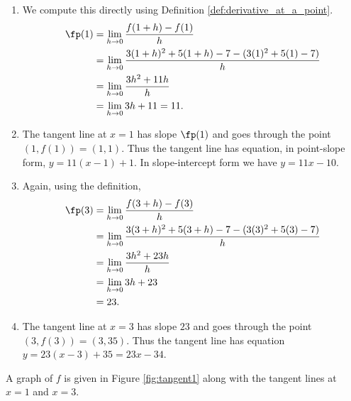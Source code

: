 %
{	\begin{enumerate}
	\item We compute this directly using Definition \ref{def:derivative_at_a_point}.
		\begin{align*}
			\fp(1) &= \lim_{h\to 0} \frac{f(1+h)-f(1)}{h} \\
				   &= \lim_{h\to 0} \frac{3(1+h)^2+5(1+h)-7 - (3(1)^2+5(1)-7)}{h}\\
				   &= \lim_{h\to 0} \frac{3h^2+11h}{h}\\
				   &= \lim_{h\to 0} 3h+11=11.%
		\end{align*}
	\item The tangent line at $x=1$ has slope $\fp(1)$ and goes through the point $(1,f(1)) = (1,1)$. Thus the tangent line has equation, in point-slope form, $y = 11(x-1) + 1$. In slope-intercept form we have $y = 11x-10$.
	\item Again, using the definition,
		\begin{align*}
			\fp(3) &= \lim_{h\to 0} \frac{f(3+h)-f(3)}{h} \\
				   &= \lim_{h\to 0} \frac{3(3+h)^2+5(3+h)-7 - (3(3)^2+5(3)-7)}{h} \\
				   &= \lim_{h\to 0} \frac{3h^2+23h}{h}\\
				   &= \lim_{h\to 0} 3h+23 \\
				   &= 23.
		\end{align*}
	\item The tangent line at $x=3$ has slope $23$ and goes through the point $(3,f(3)) = (3,35)$. Thus the tangent line has equation $y=23(x-3)+35 = 23x-34$.
	\end{enumerate}


A graph of $f$ is given in Figure \ref{fig:tangent1} along with the tangent lines at $x=1$ and $x=3$.
}\\

